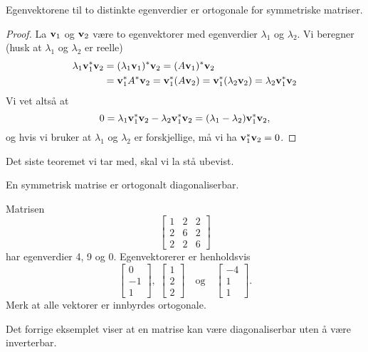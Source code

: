 \begin{thm}
Egenvektorene til to distinkte egenverdier er ortogonale for symmetriske matriser.
\end{thm}

\begin{proof}
La $\mathbf{v}_1$ og $\mathbf{v}_2$ være to egenvektorer med egenverdier $\lambda_1$ og $\lambda_2$. 
Vi beregner (husk at $\lambda_1$ og $\lambda_2$ er reelle)
\begin{align*}
\lambda_1 \mathbf{v}_1^*\mathbf{v}_2&=(\lambda_1 \mathbf{v}_1)^*\mathbf{v}_2=(A \mathbf{v}_1)^*\mathbf{v}_2\\&= \mathbf{v}_1^*A^*\mathbf{v}_2=\mathbf{v}_1^*(A\mathbf{v}_2)=\mathbf{v}_1^*(\lambda_2\mathbf{v}_2)=\lambda_2 \mathbf{v}_1^*\mathbf{v}_2
\end{align*}
Vi vet altså at
\[
0= \lambda_1 \mathbf{v}_1^*\mathbf{v}_2-\lambda_2 \mathbf{v}_1^*\mathbf{v}_2=(\lambda_1-\lambda_2) \mathbf{v}_1^*\mathbf{v}_2,
\]
og hvis vi bruker at $\lambda_1$ og $\lambda_2$ er forskjellige, må vi ha $\mathbf{v}_1^*\mathbf{v}_2=0$.
\end{proof}

\noindent Det siste teoremet vi tar med, skal vi la stå ubevist. 
\begin{thm}
En  symmetrisk matrise er ortogonalt diagonaliserbar.
\end{thm}

\begin{ex}
Matrisen 
\[
\begin{bmatrix}
1 & 2 & 2\\  2 &6 & 2 \\ 2 & 2 & 6
\end{bmatrix}
\]
har egenverdier 4, 9 og 0. Egenvektorerer er henholdsvis
\[
\begin{bmatrix}
0 \\ -1 \\ 1
\end{bmatrix},
\;
\begin{bmatrix}
1 \\ 2 \\ 2
\end{bmatrix}
\quad \text{og} \quad
\begin{bmatrix}
-4 \\ 1 \\ 1
\end{bmatrix}.
\]
Merk at alle vektorer er innbyrdes ortogonale.
\end{ex}

\begin{merkx}
Det forrige eksemplet viser at en matrise kan være diagonaliserbar uten å være inverterbar.
\end{merkx}







\kapittelslutt
